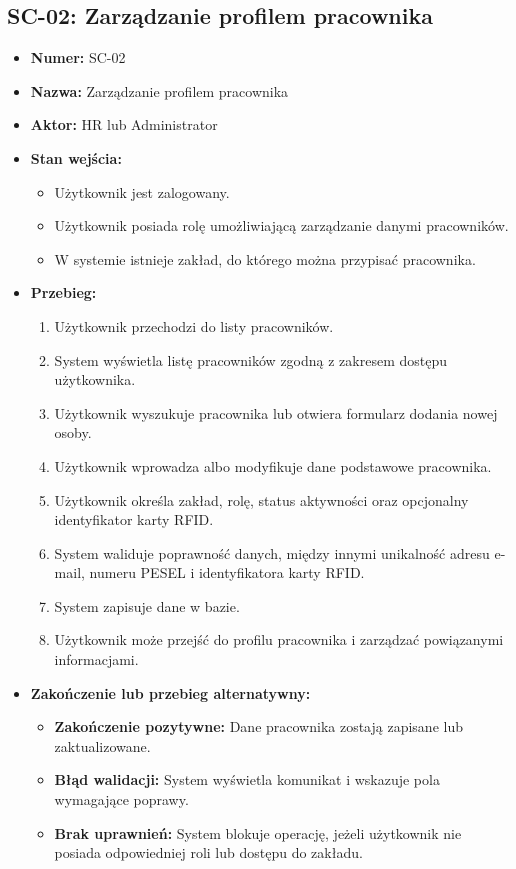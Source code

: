 \subsection{SC-02: Zarządzanie profilem pracownika}
\begin{itemize}
    \item \textbf{Numer:} SC-02
    \item \textbf{Nazwa:} Zarządzanie profilem pracownika
    \item \textbf{Aktor:} HR lub Administrator
    \item \textbf{Stan wejścia:}
    \begin{itemize}
        \item Użytkownik jest zalogowany.
        \item Użytkownik posiada rolę umożliwiającą zarządzanie danymi pracowników.
        \item W systemie istnieje zakład, do którego można przypisać pracownika.
    \end{itemize}
    \item \textbf{Przebieg:}
    \begin{enumerate}
        \item Użytkownik przechodzi do listy pracowników.
        \item System wyświetla listę pracowników zgodną z zakresem dostępu użytkownika.
        \item Użytkownik wyszukuje pracownika lub otwiera formularz dodania nowej osoby.
        \item Użytkownik wprowadza albo modyfikuje dane podstawowe pracownika.
        \item Użytkownik określa zakład, rolę, status aktywności oraz opcjonalny identyfikator karty RFID.
        \item System waliduje poprawność danych, między innymi unikalność adresu e-mail, numeru PESEL i identyfikatora karty RFID.
        \item System zapisuje dane w bazie.
        \item Użytkownik może przejść do profilu pracownika i zarządzać powiązanymi informacjami.
    \end{enumerate}
    \item \textbf{Zakończenie lub przebieg alternatywny:}
    \begin{itemize}
        \item \textbf{Zakończenie pozytywne:} Dane pracownika zostają zapisane lub zaktualizowane.
        \item \textbf{Błąd walidacji:} System wyświetla komunikat i wskazuje pola wymagające poprawy.
        \item \textbf{Brak uprawnień:} System blokuje operację, jeżeli użytkownik nie posiada odpowiedniej roli lub dostępu do zakładu.
    \end{itemize}
\end{itemize}


